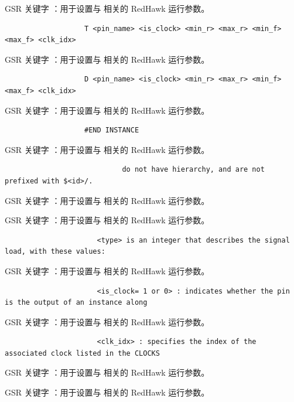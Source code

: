 GSR 关键字 ：用于设置与  相关的 RedHawk 运行参数。

\begin{lstlisting}
                   T <pin_name> <is_clock> <min_r> <max_r> <min_f> <max_f> <clk_idx>
\end{lstlisting}

GSR 关键字 ：用于设置与  相关的 RedHawk 运行参数。

\begin{lstlisting}
                   D <pin_name> <is_clock> <min_r> <max_r> <min_f> <max_f> <clk_idx>
\end{lstlisting}

GSR 关键字 ：用于设置与  相关的 RedHawk 运行参数。

\begin{lstlisting}
                   #END INSTANCE
\end{lstlisting}

GSR 关键字 ：用于设置与  相关的 RedHawk 运行参数。

\begin{lstlisting}
                            do not have hierarchy, and are not prefixed with $<id>/.
\end{lstlisting}

GSR 关键字 ：用于设置与  相关的 RedHawk 运行参数。

GSR 关键字 ：用于设置与  相关的 RedHawk 运行参数。

\begin{lstlisting}
                      <type> is an integer that describes the signal load, with these values:
\end{lstlisting}

GSR 关键字 ：用于设置与  相关的 RedHawk 运行参数。

\begin{lstlisting}
                      <is_clock= 1 or 0> : indicates whether the pin is the output of an instance along
\end{lstlisting}

GSR 关键字 ：用于设置与  相关的 RedHawk 运行参数。

\begin{lstlisting}
                      <clk_idx> : specifies the index of the associated clock listed in the CLOCKS
\end{lstlisting}

GSR 关键字 ：用于设置与  相关的 RedHawk 运行参数。

GSR 关键字 ：用于设置与  相关的 RedHawk 运行参数。

